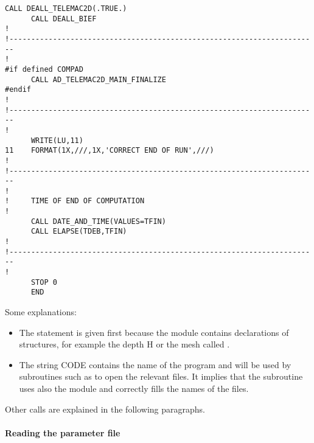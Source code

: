 \begin{lstlisting}[language=TelFortran]
      CALL DEALL_TELEMAC2D(.TRUE.)
      CALL DEALL_BIEF
!
!-----------------------------------------------------------------------
!
#if defined COMPAD
      CALL AD_TELEMAC2D_MAIN_FINALIZE
#endif
!
!-----------------------------------------------------------------------
!
      WRITE(LU,11)
11    FORMAT(1X,///,1X,'CORRECT END OF RUN',///)
!
!-----------------------------------------------------------------------
!
!     TIME OF END OF COMPUTATION
!
      CALL DATE_AND_TIME(VALUES=TFIN)
      CALL ELAPSE(TDEB,TFIN)
!
!-----------------------------------------------------------------------
!
      STOP 0
      END
\end{lstlisting}

Some explanations:
\begin{itemize}
  \item The statement  is given first because the module
     contains declarations of
     structures, for example the depth H or the mesh called
    .
  \item The string CODE contains the name of the program and will be used by
    \bief subroutines such as  to open the relevant
    files. It implies that the  subroutine uses also
    the module  and correctly fills the names of
    the files.
\end{itemize}

Other calls are explained in the following paragraphs.

\paragraph{Reading the parameter file}

